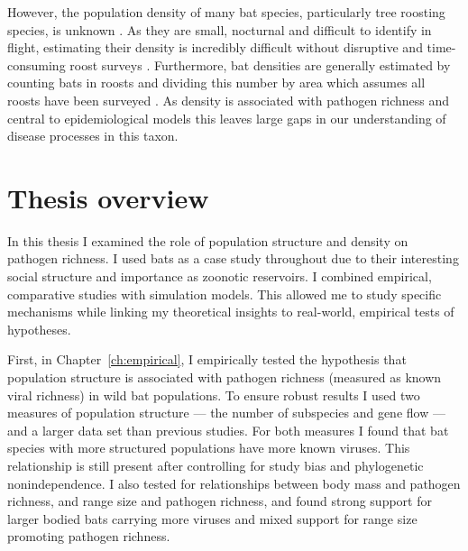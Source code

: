 However, the population density of many bat species, particularly tree roosting species, is unknown \cite{clement2013estimating}.
As they are small, nocturnal and difficult to identify in flight, estimating their density is incredibly difficult without disruptive and time-consuming roost surveys \cite{kloepper2016estimating, humphrey1971photographic, sabol1995technique}.
Furthermore, bat densities are generally estimated by counting bats in roosts and dividing this number by area which assumes all roosts have been surveyed \cite{speakman1991minimum, zahn2006population, moreno2004colony}. 
As density is associated with pathogen richness \cite{kamiya2014determines} and central to epidemiological models \cite{may1979population, anderson1979population} this leaves large gaps in our understanding of disease processes in this taxon.





\section{Thesis overview}

In this thesis I examined the role of population structure and density on pathogen richness.
I used bats as a case study throughout due to their interesting social structure and importance as zoonotic	reservoirs.
I combined empirical, comparative studies with simulation models.
This allowed me to study specific mechanisms while linking my theoretical insights to real-world, empirical tests of hypotheses.



First, in Chapter~\ref{ch:empirical}, I empirically tested the hypothesis that population structure is associated with pathogen richness (measured as known viral richness) in wild bat populations.
To ensure robust results I used two measures of population structure --- the number of subspecies and gene flow --- and a larger data set than previous studies.
For both measures I found that bat species with more structured populations have more known viruses.
This relationship is still present after controlling for study bias and phylogenetic nonindependence.
I also tested for relationships between body mass and pathogen richness, and range size and pathogen richness, and found strong support for larger bodied bats carrying more viruses and mixed support for range size promoting pathogen richness.


